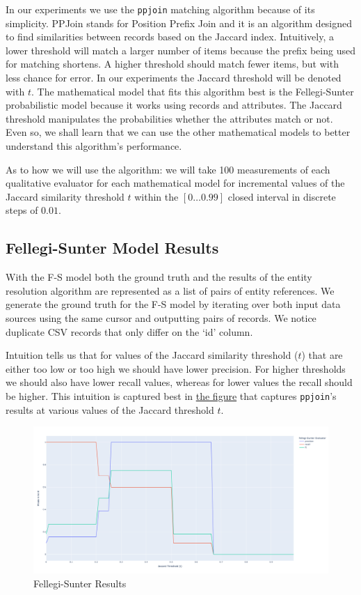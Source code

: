 \documentclass[11pt]{article}
\begin{document}
    In our experiments we use the \texttt{ppjoin}\cite{ppjoin} matching
    algorithm because of its simplicity.
    PPJoin stands for Position Prefix Join and it is an algorithm designed to
    find similarities between records based on the Jaccard
    index\cite{jaccard1912,finley1996}.
    Intuitively, a lower threshold will match a larger number of items because
    the prefix being used for matching shortens.
    A higher threshold should match fewer items, but with less chance for error.
    In our experiments the Jaccard threshold will be denoted with $t$.
    The mathematical model that fits this algorithm best is the Fellegi-Sunter
    probabilistic model because it works using records and attributes.
    The Jaccard threshold manipulates the probabilities whether the attributes
    match or not.
    Even so, we shall learn that we can use the other mathematical models to
    better understand this algorithm's performance.

    As to how we will use the algorithm: we will take 100 measurements of each
    qualitative evaluator for each mathematical model for incremental values of
    the Jaccard similarity threshold $t$ within the $[0\ldots0.99]$ closed
    interval in discrete steps of $0.01$.

    \subsection{Fellegi-Sunter Model Results}
    
    With the F-S model both the ground truth and the results of the entity
    resolution algorithm are represented as a list of pairs of entity
    references.
    We generate the ground truth for the F-S model by iterating over both
    input data sources using the same cursor and outputting pairs of records.
    We notice duplicate CSV records that only differ on the `id' column.

    Intuition tells us that for values of the Jaccard similarity threshold ($t$)
    that are either too low or too high we should have lower precision.
    For higher thresholds we should also have lower recall values, whereas for
    lower values the recall should be higher.
    This intuition is captured best in \hyperref[fsfig]{the figure} that
    captures \texttt{ppjoin}'s results at various values of the Jaccard
    threshold $t$.

    \begin{figure}
        \centering
        \includegraphics[width=\textwidth]{fsfig}
        \caption{Fellegi-Sunter Results}\label{fsfig}
    \end{figure}
\end{document}
